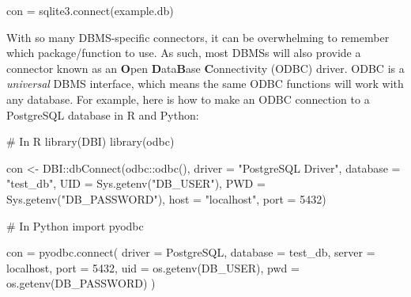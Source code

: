 \documentclass[
  letterpaper,
  DIV=11,
  numbers=noendperiod]{scrreprt}
\newenvironment{Shaded}{\begin{snugshade}}{\end{snugshade}}
\newcommand{\AttributeTok}[1]{\textcolor[rgb]{0.40,0.45,0.13}{#1}}
\newcommand{\CommentTok}[1]{\textcolor[rgb]{0.37,0.37,0.37}{#1}}
\newcommand{\DecValTok}[1]{\textcolor[rgb]{0.68,0.00,0.00}{#1}}
\newcommand{\ExtensionTok}[1]{\textcolor[rgb]{0.00,0.23,0.31}{#1}}
\newcommand{\FunctionTok}[1]{\textcolor[rgb]{0.28,0.35,0.67}{#1}}
\newcommand{\ImportTok}[1]{\textcolor[rgb]{0.00,0.46,0.62}{#1}}
\newcommand{\NormalTok}[1]{\textcolor[rgb]{0.00,0.23,0.31}{#1}}
\newcommand{\OperatorTok}[1]{\textcolor[rgb]{0.37,0.37,0.37}{#1}}
\newcommand{\OtherTok}[1]{\textcolor[rgb]{0.00,0.23,0.31}{#1}}
\newcommand{\SpecialCharTok}[1]{\textcolor[rgb]{0.37,0.37,0.37}{#1}}
\newcommand{\StringTok}[1]{\textcolor[rgb]{0.13,0.47,0.30}{#1}}
\begin{document}
\begin{Shaded}
\begin{Highlighting}[]
\NormalTok{con }\OperatorTok{=}\NormalTok{ sqlite3.}\ExtensionTok{connect}\NormalTok{(}\StringTok{\textquotesingle{}example.db\textquotesingle{}}\NormalTok{)}
\end{Highlighting}
\end{Shaded}

With so many DBMS-specific connectors, it can be overwhelming to
remember which package/function to use. As such, most DBMSs will also
provide a connector known as an \textbf{O}pen \textbf{D}ata\textbf{B}ase
\textbf{C}onnectivity (ODBC) driver. ODBC is a \emph{universal} DBMS
interface, which means the same ODBC functions will work with any
database. For example, here is how to make an ODBC connection to a
PostgreSQL database in R and Python:

\begin{Shaded}
\begin{Highlighting}[]
\CommentTok{\# In R}
\FunctionTok{library}\NormalTok{(DBI)}
\FunctionTok{library}\NormalTok{(odbc)}

\NormalTok{con }\OtherTok{\textless{}{-}}\NormalTok{ DBI}\SpecialCharTok{::}\FunctionTok{dbConnect}\NormalTok{(odbc}\SpecialCharTok{::}\FunctionTok{odbc}\NormalTok{(),}
  \AttributeTok{driver =} \StringTok{"PostgreSQL Driver"}\NormalTok{,}
  \AttributeTok{database =} \StringTok{"test\_db"}\NormalTok{,}
  \AttributeTok{UID    =} \FunctionTok{Sys.getenv}\NormalTok{(}\StringTok{"DB\_USER"}\NormalTok{),}
  \AttributeTok{PWD    =} \FunctionTok{Sys.getenv}\NormalTok{(}\StringTok{"DB\_PASSWORD"}\NormalTok{),}
  \AttributeTok{host =} \StringTok{"localhost"}\NormalTok{,}
  \AttributeTok{port =} \DecValTok{5432}\NormalTok{)}
\end{Highlighting}
\end{Shaded}

\begin{Shaded}
\begin{Highlighting}[]
\CommentTok{\# In Python}
\ImportTok{import}\NormalTok{ pyodbc}

\NormalTok{con }\OperatorTok{=}\NormalTok{ pyodbc.}\ExtensionTok{connect}\NormalTok{(}
\NormalTok{  driver }\OperatorTok{=} \StringTok{\textquotesingle{}PostgreSQL\textquotesingle{}}\NormalTok{,}
\NormalTok{  database }\OperatorTok{=} \StringTok{\textquotesingle{}test\_db\textquotesingle{}}\NormalTok{,}
\NormalTok{  server }\OperatorTok{=} \StringTok{\textquotesingle{}localhost\textquotesingle{}}\NormalTok{,}
\NormalTok{  port }\OperatorTok{=} \DecValTok{5432}\NormalTok{, }
\NormalTok{  uid }\OperatorTok{=}\NormalTok{ os.getenv(}\StringTok{\textquotesingle{}DB\_USER\textquotesingle{}}\NormalTok{),}
\NormalTok{  pwd }\OperatorTok{=}\NormalTok{ os.getenv(}\StringTok{\textquotesingle{}DB\_PASSWORD\textquotesingle{}}\NormalTok{)}
\NormalTok{)}
\end{Highlighting}
\end{Shaded}
\end{document}
